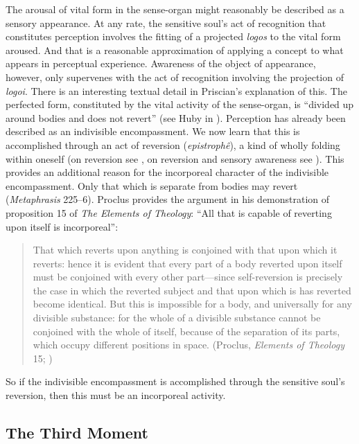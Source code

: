 \documentclass[12pt]{article}
\begin{document}
The arousal of vital form in the sense-organ might reasonably be described as a sensory appearance. At any rate, the sensitive soul's act of recognition that constitutes perception involves the fitting of a projected \emph{logos} to the vital form aroused. And that is a reasonable approximation of applying a concept to what appears in perceptual experience. Awareness of the object of appearance, however, only supervenes with the act of recognition involving the projection of \emph{logoi}. There is an interesting textual detail in Priscian's explanation of this. The perfected form, constituted by the vital activity of the sense-organ, is ``divided up around bodies and does not revert'' (see Huby in \citealt[51 n.31]{Sorabji:1997ly}). Perception has already been described as an indivisible encompassment. We now learn that this is accomplished through an act of reversion (\emph{epistrophê}), a kind of wholly folding within oneself (on reversion see \citealt[126-30]{Lloyd:1990dp}, on reversion and sensory awareness see \citealt{Lautner:1994cs}). This provides an additional reason for the incorporeal character of the indivisible encompassment. Only that which is separate from bodies may revert (\emph{Metaphrasis} 225--6). Proclus provides the argument in his demonstration of proposition 15 of \emph{The Elements of Theology}: ``All that is capable of reverting upon itself is incorporeal'':
\begin{quote}
	That which reverts upon anything is conjoined with that upon which it reverts: hence it is evident that every part of a body reverted upon itself must be conjoined with every other part---since self-reversion is precisely the case in which the reverted subject and that upon which is has reverted become identical. But this is impossible for a body, and universally for any divisible substance: for the whole of a divisible substance cannot be conjoined with the whole of itself, because of the separation of its parts, which occupy different positions in space. (Proclus, \emph{Elements of Theology} 15; \citealt[18--19]{Dodds:1963ul})
\end{quote}
So if the indivisible encompassment is accomplished through the sensitive soul's reversion, then this must be an incorporeal activity. 


\subsection{The Third Moment} %
\label{sub:the_third_moment}
\end{document}
